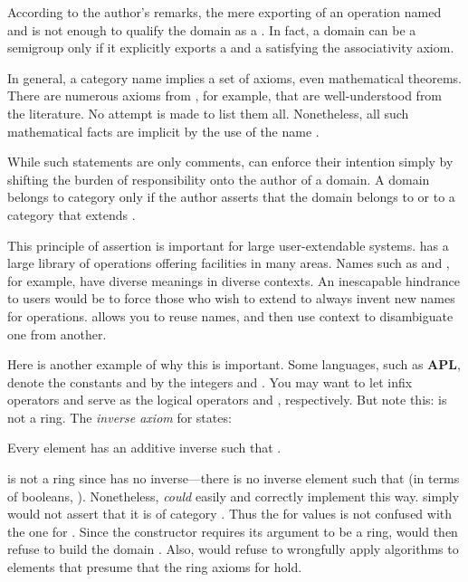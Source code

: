 {{{According to the author's remarks, the mere
exporting of an operation named \spadop{*} and \spadop{^} is not
enough to qualify the domain as a .
In fact, a domain can be a semigroup only if it explicitly
exports a \spadop{^} and
a \spadop{*} satisfying the associativity axiom.

In general, a category name implies a set of axioms, even mathematical
theorems.
There are numerous axioms from , for example,
that are well-understood from the literature.
No attempt is made to list them all.
Nonetheless, all such mathematical facts are implicit by the use of the
name .


While such statements are only comments,
\Language{} can enforce their intention simply by shifting the burden of
responsibility onto the author of a domain.
A domain belongs to category  only if the
author asserts that the domain  belongs to  or
to a category that extends .

This principle of assertion is important for large user-extendable
systems.
\Language{} has a large library of operations offering facilities in
many areas.
Names such as  and , for example, have
diverse meanings in diverse contexts.
An inescapable hindrance to users would be to force those who wish to
extend \Language{} to always invent new names for operations.
\Language{} allows you to reuse names, and then use context to disambiguate one
from another.

Here is another example of why this is important.
Some languages, such as {\bf APL},
denote the  constants  and
 by the integers  and .
You may want to let infix operators \spadop{+} and \spadop{*} serve as the logical
operators  and , respectively.
But note this:  is not a ring.
The {\it inverse axiom} for  states:
%
\begin{center}
Every element  has an additive inverse  such that
.
\end{center}
%
 is not a ring since  has
no inverse---there is no inverse element  such that
 (in terms of booleans, ).
Nonetheless, \Language{} {\it could} easily and correctly implement
 this way.
 simply would not assert that it is of category
.
Thus the \spadop{+} for  values
is not confused with the one for .
Since the  constructor requires its argument
to be a ring, \Language{} would then refuse to build the
domain . Also, \Language{} would refuse to
wrongfully apply algorithms to  elements that  presume that the
ring axioms for \spadop{+} hold.

}}}

